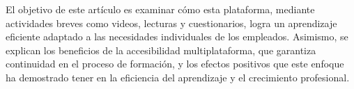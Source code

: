 El objetivo de este artículo es examinar cómo esta plataforma, mediante
actividades breves como videos, lecturas y cuestionarios, logra un aprendizaje
eficiente adaptado a las necesidades individuales de los empleados. Asimismo, se
explican los beneficios de la accesibilidad multiplataforma, que garantiza
continuidad en el proceso de formación, y los efectos positivos que este enfoque
ha demostrado tener en la eficiencia del aprendizaje y el crecimiento
profesional.